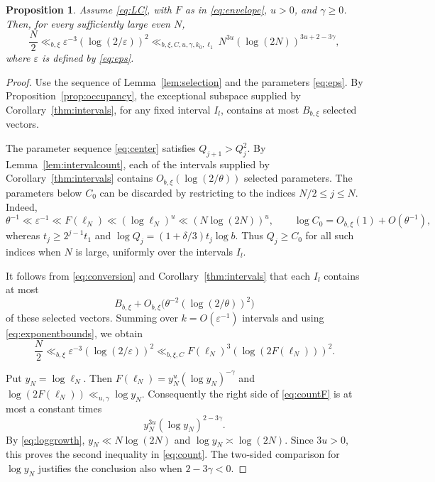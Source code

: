 \documentclass[11pt]{article}
\numberwithin{equation}{section}
\newtheorem{proposition}[theorem]{Proposition}
\theoremstyle{remark}
\newcommand{\eps}{\varepsilon}
\begin{document}
\begin{proposition}\label{prop:count}
Assume \eqref{eq:LC}, with $F$ as in \eqref{eq:envelope},
$u>0$, and $\gamma\ge0$. Then, for every sufficiently large even $N$,
\begin{equation}\label{eq:count}
 \frac N2
 \ll_{b,\xi}\eps^{-3}(\log(2/\eps))^2
 \ll_{b,\xi,C,u,\gamma,k_0,\ell_1}
 N^{3u}(\log(2N))^{3u+2-3\gamma},
\end{equation}
where $\eps$ is defined by \eqref{eq:eps}.
\end{proposition}
\begin{proof}
Use the sequence of Lemma~\ref{lem:selection} and the parameters
\eqref{eq:eps}. By Proposition~\ref{prop:occupancy}, the exceptional
subspace supplied by Corollary~\ref{thm:intervals}, for any fixed
interval $I_l$, contains at most $B_{b,\xi}$ selected vectors.

The parameter sequence \eqref{eq:center} satisfies $Q_{j+1}>Q_j^2$.
By Lemma~\ref{lem:intervalcount}, each of the intervals supplied by
Corollary~\ref{thm:intervals} contains
$O_{b,\xi}(\log(2/\theta))$ selected parameters.
The parameters below $C_0$ can be discarded by restricting to the
indices $N/2\le j\le N$. Indeed,
\begin{equation}\label{eq:threshold}
 \theta^{-1}\ll\eps^{-1}\ll F(\ell_N)\ll(\log\ell_N)^u
             \ll(N\log(2N))^u,
 \qquad
 \log C_0=O_{b,\xi}(1)+O(\theta^{-1}),
\end{equation}
whereas $t_j\ge2^{j-1}t_1$ and
$\log Q_j=(1+\delta/3)t_j\log b$.
Thus $Q_j\ge C_0$ for all such indices when $N$ is large,
uniformly over the intervals $I_l$.

It follows from \eqref{eq:conversion} and
Corollary~\ref{thm:intervals} that each $I_l$ contains at most
\[
 B_{b,\xi}
 +O_{b,\xi}\bigl(\theta^{-2}(\log(2/\theta))^2\bigr)
\]
of these selected vectors. Summing over $k=O(\eps^{-1})$ intervals
and using \eqref{eq:exponentbounds}, we obtain
\begin{equation}\label{eq:countF}
 \frac N2
 \ll_{b,\xi}\eps^{-3}(\log(2/\eps))^2
 \ll_{b,\xi,C} F(\ell_N)^3(\log(2F(\ell_N)))^2.
\end{equation}

Put $y_N=\log\ell_N$. Then
$F(\ell_N)=y_N^u(\log y_N)^{-\gamma}$ and
$\log(2F(\ell_N))\ll_{u,\gamma}\log y_N$.
Consequently the right side of \eqref{eq:countF} is at most a constant
times
\[
 y_N^{3u}(\log y_N)^{2-3\gamma}.
\]
By \eqref{eq:loggrowth}, $y_N\ll N\log(2N)$ and
$\log y_N\asymp\log(2N)$. Since $3u>0$, this proves the second
inequality in \eqref{eq:count}. The two-sided comparison for
$\log y_N$ justifies the conclusion also when $2-3\gamma<0$.
\end{proof}
\end{document}
